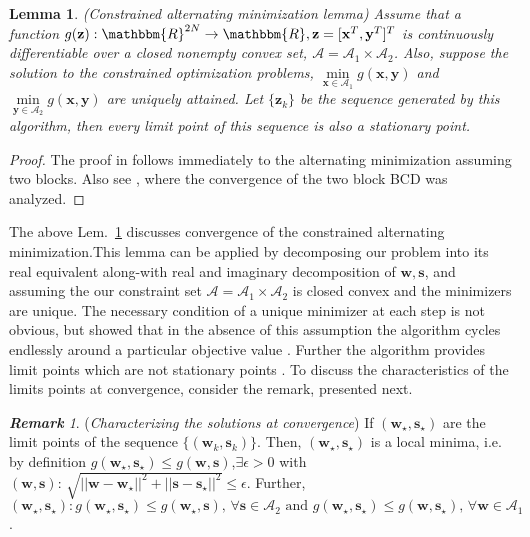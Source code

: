 \documentclass[11pt,draftclsnofoot,onecolumn]{IEEEtran}
\newtheorem{lem}{\bf {Lemma}}
\theoremstyle{definition}
\theoremstyle{remark}
\newtheorem{remk}{\bf Remark}
\begin{document}
\begin{lem} \label{altminlemma}
(Constrained alternating minimization lemma) Assume that a function $g(\mathbf{z}):\mathbbm{R}^{2N}\rightarrow\mathbbm{R},\mathbf{z}=[\mathbf{x}^T,\mathbf{y}^T]^T$ is continuously differentiable over a closed nonempty convex set, $\mathcal{A}=\mathcal{A}_1\times\mathcal{A}_2$. Also, suppose the solution to the constrained optimization problems, $\min \limits_{\mathbf{x}\in\mathcal{A}_1} g(\mathbf{x},\mathbf{y} )$ and $\min \limits_{\mathbf{y}\in\mathcal{A}_2} g(\mathbf{x},\mathbf{y} )$ are uniquely attained. Let $\{ \mathbf{z}_k \}$ be the sequence generated by this algorithm, then every limit point of this sequence is also a stationary point.
\end{lem}
\begin{proof}
The proof in \cite[Prop.~2.7.1]{Bertsekas1999} follows immediately to the alternating minimization assuming two blocks. Also see \cite{Grippo2000}, where the convergence of the two block BCD was analyzed. 
\end{proof}
The above Lem.~\ref{altminlemma} discusses convergence of the constrained alternating minimization.This lemma can be applied by decomposing our problem into its real equivalent along-with real and imaginary decomposition of $\mathbf{w},\mathbf{s}$, and assuming the our constraint set $\mathcal{A}=\mathcal{A}_1\times\mathcal{A}_2$ is closed convex and the minimizers are unique. The necessary condition of a unique minimizer \cite{Zangwill1967} at each step is not obvious, but \cite{Powell1973} showed that in the absence of this assumption the algorithm cycles endlessly around a particular objective value \cite{Bertsekas1999}. Further the algorithm provides limit points which are not stationary points \cite{Grippo2000}. To discuss the characteristics of the limits points at convergence, consider the remark, presented next.

\begin{remk} \label{limitpointremk} ({\it Characterizing the solutions at convergence})
If $(\mathbf{w}_\star,\mathbf{s}_\star)$ are the limit points of the sequence $\{(\mathbf{w}_k,\mathbf{s}_k)\}$. Then, $(\mathbf{w}_\star,\mathbf{s}_\star)$ is a local minima, i.e. by definition $g(\mathbf{w}_\star,\mathbf{s}_\star)\leq g(\mathbf{w},\mathbf{s})$,$\exists \epsilon>0$ with $(\mathbf{w},\mathbf{s}):\,\sqrt{|| \mathbf{w}-\mathbf{w}_\star||^2+|| \mathbf{s}-\mathbf{s}_\star||^2}\leq \epsilon$. Further, $(\mathbf{w}_\star,\mathbf{s}_\star):g(\mathbf{w}_\star,\mathbf{s}_\star)\leq g(\mathbf{w}_\star,\mathbf{s}),\,\forall \mathbf{s}\in\mathcal{A}_2\mbox{ and } g(\mathbf{w}_\star,\mathbf{s}_\star)\leq g(\mathbf{w},\mathbf{s}_\star),\,\forall \mathbf{w}\in\mathcal{A}_{1}$.
\end{remk}
\end{document}
